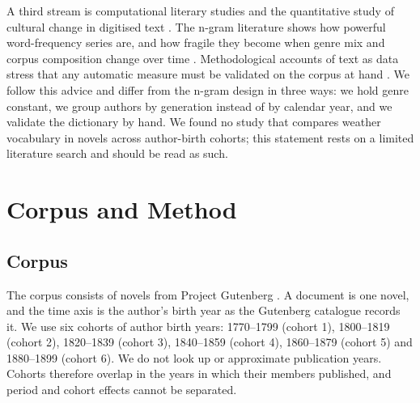 \documentclass[11pt]{article}
\begin{document}
A third stream is computational literary studies and the quantitative study of cultural change in digitised text \citep{bories2022the, krautter2023the}. The n-gram literature shows how powerful word-frequency series are, and how fragile they become when genre mix and corpus composition change over time \citep{michel2010quantitative, koplenig2015why, koplenig2015the}. Methodological accounts of text as data stress that any automatic measure must be validated on the corpus at hand \citep{grimmer2013text, gentzkow2019text}. We follow this advice and differ from the n-gram design in three ways: we hold genre constant, we group authors by generation instead of by calendar year, and we validate the dictionary by hand. We found no study that compares weather vocabulary in novels across author-birth cohorts; this statement rests on a limited literature search and should be read as such.

\section{Corpus and Method}

\subsection{Corpus}

The corpus consists of novels from Project Gutenberg \citep{ProjectGutenberg}. A document is one novel, and the time axis is the author's birth year as the Gutenberg catalogue records it. We use six cohorts of author birth years: 1770--1799 (cohort 1), 1800--1819 (cohort 2), 1820--1839 (cohort 3), 1840--1859 (cohort 4), 1860--1879 (cohort 5) and 1880--1899 (cohort 6). We do not look up or approximate publication years. Cohorts therefore overlap in the years in which their members published, and period and cohort effects cannot be separated.
\end{document}
